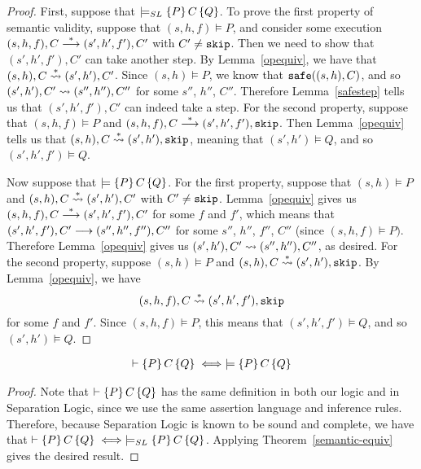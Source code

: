 \begin{proof}
First, suppose that $\models_{SL} \{P\}\,C\,\{Q\}$. To prove the first property of semantic validity, suppose that
$(s,h,f) \models P$, and consider some execution $(s,h,f),C \stackrel{*}{\longrightarrow} (s',h',f'),C'$ with
$C' \neq \text{\tt{skip}}$. Then we need to show that $(s',h',f'),C'$ can take another step. By Lemma~\ref{opequiv},
we have that $(s,h),C \stackrel{*}{\leadsto} (s',h'),C'$. Since $(s,h) \models P$, we know that $\text{\tt{safe}}((s,h),C)$, and
so $(s',h'),C' \leadsto (s'',h''),C''$ for some $s''$, $h''$, $C''$. Therefore Lemma~\ref{safestep} tells
us that $(s',h',f'),C'$ can indeed take a step. For the second property, suppose that $(s,h,f) \models P$
and $(s,h,f),C \stackrel{*}{\longrightarrow} (s',h',f'),\text{\tt{skip}}$. Then Lemma~\ref{opequiv} tells us that $(s,h),C \stackrel{*}{\leadsto} (s',h'),\text{\tt{skip}}$,
meaning that $(s',h') \models Q$, and so $(s',h',f') \models Q$.

Now suppose that $\models \left\{P\right\} C \left\{Q\right\}$. For the first property, suppose that $(s,h) \models P$ and 
$(s,h),C \stackrel{*}{\leadsto} (s',h'),C'$ with $C' \neq \text{\tt{skip}}$. Lemma~\ref{opequiv} gives us 
$(s,h,f),C \stackrel{*}{\longrightarrow} (s',h',f'),C'$ for some $f$ and $f'$, which means that $(s',h',f'),C' \longrightarrow (s'',h'',f''),C''$
for some $s''$, $h''$, $f''$, $C''$ (since $(s,h,f) \models P)$. Therefore Lemma~\ref{opequiv} 
gives us $(s',h'),C' \leadsto (s'',h''),C''$, as desired. For the second property, suppose $(s,h) \models P$
and $(s,h),C \stackrel{*}{\leadsto} (s',h'),\text{\tt{skip}}$. By Lemma~\ref{opequiv}, we have 
\[
(s,h,f),C \stackrel{*}{\leadsto} (s',h',f'),\text{\tt{skip}}
\]
for some $f$ and $f'$. Since $(s,h,f) \models P$, this means that $(s',h',f') \models Q$, and so
$(s',h') \models Q$. 
\end{proof}

\begin{thm}
\label{sound-complete}
\begin{align*}
\vdash \{P\}\,C\,\{Q\} \iff \models \left\{P\right\} C \left\{Q\right\}
\end{align*}
\end{thm}

\begin{proof}
Note that $\vdash \{P\}\,C\,\{Q\}$ has the same definition in both our logic and in Separation Logic, since we
use the same assertion language and inference rules. Therefore, because Separation Logic is known to be
sound and complete, we have that $\vdash \{P\}\,C\,\{Q\} \iff \models_{SL} \{P\}\,C\,\{Q\}$. Applying
Theorem~\ref{semantic-equiv} gives the desired result.
\end{proof}

\fi
\ifextended

